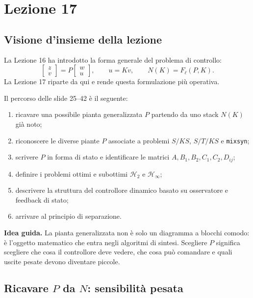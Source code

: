 \documentclass[11pt,a4paper]{article}
\begin{document}
\section{Lezione 17}

\subsection{Visione d'insieme della lezione}

La Lezione 16 ha introdotto la forma generale del problema di controllo:
$$
\begin{bmatrix}
z\\
v
\end{bmatrix}
=
P
\begin{bmatrix}
w\\
u
\end{bmatrix},
\qquad
u=Kv,
\qquad
N(K)=F_\ell(P,K).
$$
La Lezione 17 riparte da qui e rende questa formulazione pi\`u operativa.

Il percorso delle slide 25--42 \`e il seguente:
\begin{enumerate}
    \item ricavare una possibile pianta generalizzata $P$ partendo da uno stack $N(K)$ gi\`a noto;
    \item riconoscere le diverse piante $P$ associate a problemi $S/KS$, $S/T/KS$ e \texttt{mixsyn};
    \item scrivere $P$ in forma di stato e identificare le matrici $A,B_1,B_2,C_1,C_2,D_{ij}$;
    \item definire i problemi ottimi e subottimi $\mathcal{H}_2$ e $\mathcal{H}_\infty$;
    \item descrivere la struttura del controllore dinamico basato su osservatore e feedback di stato;
    \item arrivare al principio di separazione.
\end{enumerate}

\begin{keybox}
\textbf{Idea guida.} La pianta generalizzata non \`e solo un diagramma a blocchi comodo: \`e l'oggetto matematico che entra negli algoritmi di sintesi. Scegliere $P$ significa scegliere che cosa il controllore deve vedere, che cosa pu\`o comandare e quali uscite pesate devono diventare piccole.
\end{keybox}

\subsection{Ricavare \texorpdfstring{$P$}{P} da \texorpdfstring{$N$}{N}: sensibilit\`a pesata}
\end{document}

